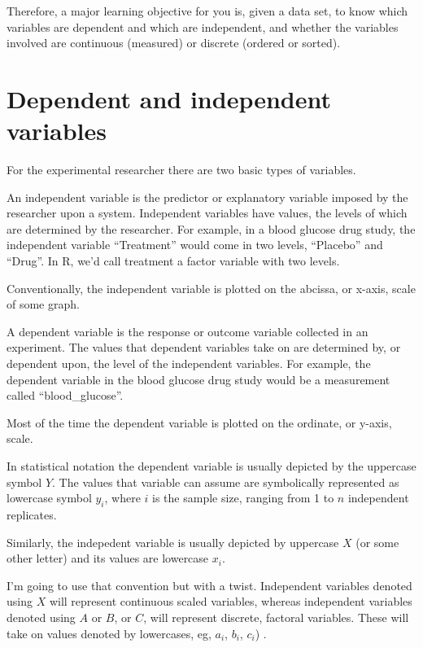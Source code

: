 \documentclass[]{book}
\begin{document}
Therefore, a major learning objective for you is, given a data set, to know which variables are dependent and which are independent, and whether the variables involved are continuous (measured) or discrete (ordered or sorted).

\hypertarget{dependent-and-independent-variables}{%
\section{Dependent and independent variables}\label{dependent-and-independent-variables}}

For the experimental researcher there are two basic types of variables.

An independent variable is the predictor or explanatory variable imposed by the researcher upon a system. Independent variables have values, the levels of which are determined by the researcher. For example, in a blood glucose drug study, the independent variable ``Treatment'' would come in two levels, ``Placebo'' and ``Drug''. In R, we'd call treatment a factor variable with two levels.

Conventionally, the independent variable is plotted on the abcissa, or x-axis, scale of some graph.

A dependent variable is the response or outcome variable collected in an experiment. The values that dependent variables take on are determined by, or dependent upon, the level of the independent variables. For example, the dependent variable in the blood glucose drug study would be a measurement called ``blood\_glucose''.

Most of the time the dependent variable is plotted on the ordinate, or y-axis, scale.

In statistical notation the dependent variable is usually depicted by the uppercase symbol \(Y\). The values that variable can assume are symbolically represented as lowercase symbol \(y_i\), where \(i\) is the sample size, ranging from 1 to \(n\) independent replicates.

Similarly, the indepedent variable is usually depicted by uppercase \(X\) (or some other letter) and its values are lowercase \(x_i\).

I'm going to use that convention but with a twist. Independent variables denoted using \(X\) will represent continuous scaled variables, whereas independent variables denoted using \(A\) or \(B\), or \(C\), will represent discrete, factoral variables. These will take on values denoted by lowercases, eg, \(a_i\), \(b_i\), \(c_i\)) .
\end{document}
